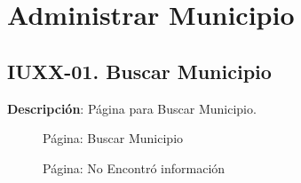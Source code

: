 \begin{table}[H]
	\caption{Forma: Eliminar Entidad Federativa}
	\label{tab:ui-delete-entidadfederativa-form}
\end{table}



\clearpage
\section{Administrar Municipio} \label{sec:cf-ui-admin-municipio}

\subsection{IUXX-01. Buscar Municipio} \label{sec:ui-page-search-municipio}

\textbf{Descripción}: Página para Buscar Municipio.\\

\begin{figure}[H]
	\label{tab:ui-search-municipio-page}
	\caption{Página: Buscar Municipio}
\end{figure}

\begin{figure}[H]
	\label{tab:ui-nosearch-municipio-page}
	\caption{Página: No Encontró información}
\end{figure}

